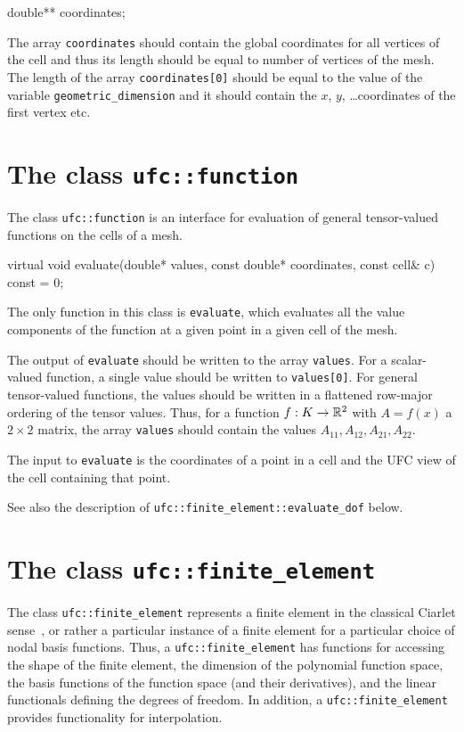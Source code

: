\begin{code}
double** coordinates;
\end{code}

The array \texttt{coordinates} should contain the global coordinates
for all vertices of the cell and thus its length should be equal to
number of vertices of the mesh. The length of the array
\texttt{coordinates[0]} should be equal to the value of the variable
\texttt{geometric\_dimension} and it should contain the $x$, $y$,
\ldots coordinates of the first vertex etc.

\section{The class \texttt{ufc::function}}

The class \texttt{ufc::function} is an interface for evaluation of
general tensor-valued functions on the cells of a mesh.

\begin{code}
virtual void evaluate(double* values,
                      const double* coordinates,
                      const cell& c) const = 0;
\end{code}

The only function in this class is \texttt{evaluate}, which evaluates
all the value components of the function at a given point in a given
cell of the mesh.

The output of \texttt{evaluate} should be written to the array
\texttt{values}. For a scalar-valued function, a single value should be
written to \texttt{values[0]}. For general tensor-valued functions,
the values should be written in a flattened row-major ordering of the
tensor values. Thus, for a function $f : K \rightarrow \mathbb{R}^2$ with $A =
f(x)$ a $2 \times 2$ matrix, the array \texttt{values} should contain
the values $A_{11}, A_{12}, A_{21}, A_{22}$.

The input to \texttt{evaluate} is the coordinates of a point in a cell
and the UFC view of the cell containing that point.

See also the description of
\texttt{ufc::finite\_element::evaluate\_dof} below.

\section{The class \texttt{ufc::finite\_element}}

The class \texttt{ufc::finite\_element} represents a finite element in
the classical Ciarlet sense~\cite{Cia78}, or rather a particular
instance of a finite element for a particular choice of nodal basis
functions. Thus, a \texttt{ufc::finite\_element} has functions for
accessing the shape of the finite element, the dimension of the
polynomial function space, the basis functions of the function space
(and their derivatives), and the linear functionals defining the
degrees of freedom. In addition, a \texttt{ufc::finite\_element}
provides functionality for interpolation.

